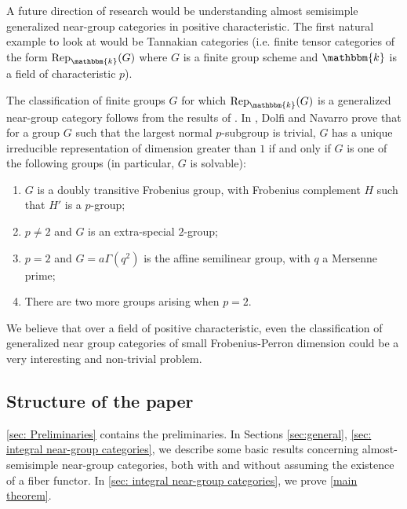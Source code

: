\documentclass{amsart}
\theoremstyle{plain}%
\theoremstyle{remark}
\newcommand{\1}{\mathbbm{1}}
\newcommand{\Rep}{\mathrm{Rep}}
\newcommand{\kk}{\mathbbm{k}}
\begin{document}
    A future direction of research would be understanding almost semisimple generalized near-group categories in positive characteristic. The first natural example to look at would be Tannakian categories (i.e. finite tensor categories of the form $\Rep_{\kk}(G)$ where $G$ is a finite group scheme and $\kk$ is a field of characteristic $p$). 
    
    The classification of finite groups $G$ for which $\Rep_{\kk}(G)$ is a generalized near-group category follows from the results of \cite{DN}. In \cite{DN}, Dolfi and Navarro prove that for a group $G$ such that the largest normal $p$-subgroup is trivial, $G$ has a unique irreducible representation of dimension greater than $1$ if and only if $G$ is one of the following groups (in particular, $G$ is solvable):
    \begin{enumerate}
        \item $G$ is a doubly transitive Frobenius group, with Frobenius complement $H$ such that $H'$ is a $p$-group;
        \item $p\ne 2$ and $G$ is an extra-special $2$-group;
        \item $p=2$ and $G = a\Gamma(q^2)$ is the affine semilinear group, with $q$ a Mersenne prime;
        \item  There are two more groups arising when $p=2$. 
    \end{enumerate}
   
We believe that over a field of positive characteristic, even the classification of generalized near group categories of small Frobenius-Perron dimension could be a very interesting and non-trivial problem.
\subsection{Structure of the paper}

   \cref{sec: Preliminaries} contains the preliminaries.
    In Sections \ref{sec:general}, \ref{sec: integral near-group categories}, we describe some basic results concerning almost-semisimple near-group categories, both with and without assuming the existence of a fiber functor. In \cref{sec: integral near-group categories}, we prove \cref{main theorem}. 
    
\end{document}
